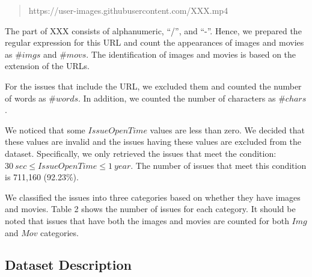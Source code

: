 \begin{quote}
	https://user-images.githubusercontent.com/XXX.mp4
\end{quote}

\noindent{}
The part of XXX consists of alphanumeric, ``/'', and ``-''.
Hence, we prepared the regular expression for this URL and 
count the appearances of images and movies as $\#imgs$ and $\#movs$. 
The identification of images and movies is based on the extension of 
the URLs. 

For the issues that include the URL, we excluded them and 
counted the number of words as $\#words$. 
In addition, we counted the number of characters as $\#chars$. 

We noticed that some $IssueOpenTime$ values are less than zero. 
We decided that these values are invalid and the issues having 
these values are excluded from the dataset. 
Specifically, we only retrieved the issues that meet 
the condition: $30\ sec \leq IssueOpenTime \leq 1\ year$.
The number of issues that meet this condition is 711,160 (92.23\%).



We classified the issues into three categories based on 
whether they have images and movies. 
Table 2 shows the number of issues for each category. 
It should be noted that issues that have both 
the images and movies are counted for both 
$Img$ and $Mov$ categories. 

\subsection{Dataset Description}

